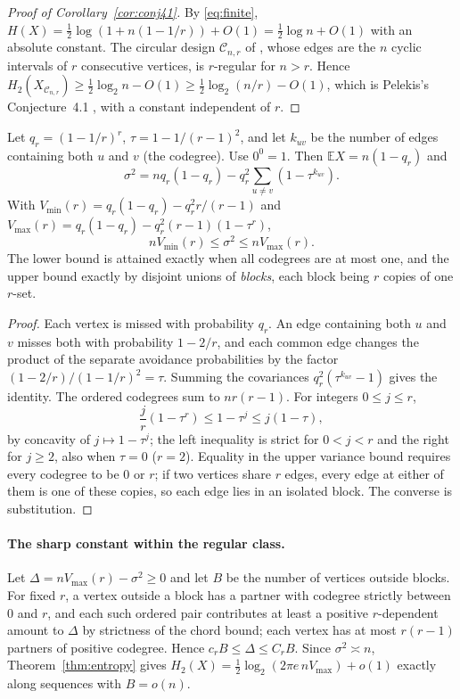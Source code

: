 \documentclass[11pt,a4paper]{article}
\theoremstyle{definition}\newtheorem{remark}[theorem]{Remark}\newtheorem{conjecture}{Conjecture}
\newcommand{\E}{\mathbb E}\newcommand{\Prb}{\mathbb P}\newcommand{\Var}{\operatorname{Var}}
\begin{document}
\begin{proof}[Proof of Corollary~\ref{cor:conj41}]
By \eqref{eq:finite}, $H(X)=\tfrac12\log(1+n(1-1/r))+O(1)=\tfrac12\log n+O(1)$ with an absolute constant. The circular design $\mathcal C_{n,r}$ of \cite[p.~128]{pelekis}, whose edges are the $n$ cyclic intervals of $r$ consecutive vertices, is $r$-regular for $n>r$. Hence $H_2(X_{\mathcal C_{n,r}})\ge\tfrac12\log_2n-O(1)\ge\tfrac12\log_2(n/r)-O(1)$, which is Pelekis's Conjecture~4.1 \cite[p.~129]{pelekis}, with a constant independent of $r$.
\end{proof}

\begin{proposition}\label{prop:variance}
Let $q_r=(1-1/r)^r$, $\tau=1-1/(r-1)^2$, and let $k_{uv}$ be the number of edges containing both $u$ and $v$ (the codegree). Use $0^0=1$. Then $\E X=n(1-q_r)$ and
\[
 \sigma^2=nq_r(1-q_r)-q_r^2\sum_{u\ne v}(1-\tau^{k_{uv}}).
\]
With $V_{\min}(r)=q_r(1-q_r)-q_r^2 r/(r-1)$ and
$V_{\max}(r)=q_r(1-q_r)-q_r^2(r-1)(1-\tau^r)$,
\[
                        nV_{\min}(r)\le\sigma^2\le nV_{\max}(r).
\]
The lower bound is attained exactly when all codegrees are at most one, and the upper bound exactly by disjoint unions of \emph{blocks}, each block being $r$ copies of one $r$-set.
\end{proposition}
\begin{proof}
Each vertex is missed with probability $q_r$. An edge containing both $u$ and $v$ misses both with probability $1-2/r$, and each common edge changes the product of the separate avoidance probabilities by the factor $(1-2/r)/(1-1/r)^2=\tau$. Summing the covariances $q_r^2(\tau^{k_{uv}}-1)$ gives the identity. The ordered codegrees sum to $nr(r-1)$. For integers $0\le j\le r$,
\[
 \frac{j}{r}(1-\tau^r)\le1-\tau^j\le j(1-\tau),
\]
by concavity of $j\mapsto1-\tau^j$; the left inequality is strict for $0<j<r$ and the right for $j\ge2$, also when $\tau=0$ ($r=2$). Equality in the upper variance bound requires every codegree to be $0$ or $r$; if two vertices share $r$ edges, every edge at either of them is one of these copies, so each edge lies in an isolated block. The converse is substitution.
\end{proof}

\paragraph{The sharp constant within the regular class.} Let $\Delta=nV_{\max}(r)-\sigma^2\ge0$ and let $B$ be the number of vertices outside blocks. For fixed $r$, a vertex outside a block has a partner with codegree strictly between $0$ and $r$, and each such ordered pair contributes at least a positive $r$-dependent amount to $\Delta$ by strictness of the chord bound; each vertex has at most $r(r-1)$ partners of positive codegree. Hence $c_rB\le\Delta\le C_rB$. Since $\sigma^2\asymp n$, Theorem~\ref{thm:entropy} gives $H_2(X)=\tfrac12\log_2(2\pi e\,nV_{\max})+o(1)$ exactly along sequences with $B=o(n)$.
\end{document}
